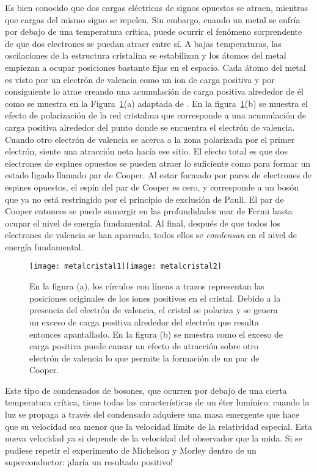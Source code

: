 Es bien conocido que dos cargas eléctricas de signos opuestos se atraen, mientras que cargas del mismo signo se repelen. Sin embargo, cuando un metal se enfría por debajo de una temperatura crítica, puede ocurrir el fenómeno sorprendente de que dos electrones se puedan atraer entre sí. A bajas temperaturas, las oscilaciones de la estructura cristalina se estabilizan y los átomos del metal empiezan a ocupar posiciones bastante fijas en el espacio. Cada átomo del metal es visto por un electrón de valencia como un ion de carga positiva y por consiguiente lo atrae creando una acumulación de carga positiva alrededor de él como se muestra en la Figura~\ref{fig:1}(a) adaptada de \cite{beamline}.  En la figura~\ref{fig:1}(b) se muestra  el efecto de polarización de la red cristalina que corresponde a una acumulación de carga positiva alrededor del punto donde se encuentra el electrón de valencia. Cuando otro electrón de valencia se acerca a la zona polarizada por el primer electrón,  siente una atracción neta hacía ese sitio. El efecto total es que dos electrones de espines opuestos se pueden atraer lo suficiente como para formar un estado ligado llamado par de Cooper. Al estar formado por pares de electrones de espines opuestos, el espín del par de Cooper es cero, y corresponde a un  bosón que ya no está restringido por el principio de exclusión de Pauli. El par de Cooper entonces se puede sumergir en las profundidades mar de Fermi hasta ocupar el nivel de energía fundamental. Al final, después de que todos los electrones de valencia se han apareado, todos ellos se \emph{condensan} en el nivel de energía fundamental.

\begin{figure}
  \centering
  \texttt{[image: metalcristal1]}\hspace{4cm}\texttt{[image: metalcristal2]}
  \caption{En la figura (a), los círculos con líneas a trazos representan las posiciones originales de los iones positivos en el cristal. Debido a la presencia del electrón de valencia, el cristal se polariza y se genera un exceso de carga positiva alrededor del electrón que resulta entonces apantallado. En la figura (b) se muestra como el exceso de carga positiva puede causar un efecto de atracción sobre otro electrón de valencia lo que permite la formación de un par de Cooper.}
  \label{fig:1}
\end{figure}

Este tipo de condensados de bosones, que ocurren por debajo de una cierta temperatura crítica, tiene todas las características de un éter lumínico: cuando la luz se propaga a través del condensado adquiere una masa emergente que hace que su velocidad sea menor que la velocidad límite de la relatividad especial. Esta nueva velocidad ya si depende de la velocidad del observador que la mida. Si se pudiese repetir el experimento de Michelson y Morley dentro de un superconductor: ¡daría un resultado positivo!


